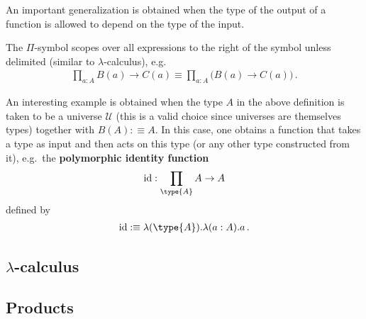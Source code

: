     An important generalization is obtained when the type of the output of a function is allowed to depend on the type of the input.
    \begin{remark}[Scope]
        The $\Pi$-symbol scopes over all expressions to the right of the symbol unless delimited (similar to $\lambda$-calculus), e.g.
        \begin{gather}
            \prod_{a:A}B(a)\rightarrow C(a)\equiv\prod_{a:A}\bigl(B(a)\rightarrow C(a)\bigr)\,.
        \end{gather}
    \end{remark}

    \begin{example}
        An interesting example is obtained when the type $A$ in the above definition is taken to be a universe $\mathcal{U}$ (this is a valid choice since universes are themselves types) together with $B(A):\equiv A$. In this case, one obtains a function that takes a type as input and then acts on this type (or any other type constructed from it), e.g.~the \textbf{polymorphic identity function}
        \begin{gather}
            \mathrm{id}:\prod_{\type{A}}A\rightarrow A
        \end{gather}
        defined by
        \begin{gather}
            \mathrm{id}:\equiv\lambda(\type{A}).\lambda(a:A).a\,.
        \end{gather}
    \end{example}

\subsection{\texorpdfstring{$\lambda$-calculus}{Lambda-calculus}}


\subsection{Products}

